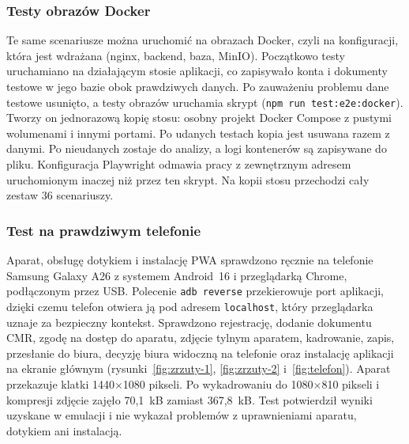 \subsubsection{Testy obrazów Docker}

Te same scenariusze można uruchomić na obrazach Docker, czyli na konfiguracji,
która jest wdrażana (nginx, backend, baza, MinIO). Początkowo testy
uruchamiano na działającym stosie aplikacji, co zapisywało konta i dokumenty
testowe w jego bazie obok prawdziwych danych. Po zauważeniu problemu dane
testowe usunięto, a testy obrazów uruchamia skrypt
 (\texttt{npm run test:e2e:docker}). Tworzy on
jednorazową kopię stosu: osobny projekt Docker Compose z pustymi wolumenami
i innymi portami. Po udanych testach kopia jest usuwana razem z danymi. Po nieudanych
zostaje do analizy, a logi kontenerów są zapisywane do pliku.
Konfiguracja Playwright odmawia pracy z zewnętrznym adresem uruchomionym
inaczej niż przez ten skrypt. Na kopii stosu przechodzi cały zestaw 36
scenariuszy.

\subsubsection{Test na prawdziwym telefonie}

Aparat, obsługę dotykiem i instalację PWA sprawdzono ręcznie na telefonie
Samsung Galaxy A26 z systemem Android~16 i przeglądarką Chrome, podłączonym
przez USB. Polecenie \texttt{adb reverse} przekierowuje port aplikacji, dzięki
czemu telefon otwiera ją pod adresem \texttt{localhost}, który przeglądarka
uznaje za bezpieczny kontekst. Sprawdzono rejestrację, dodanie dokumentu CMR,
zgodę na dostęp do aparatu, zdjęcie tylnym aparatem, kadrowanie, zapis,
przesłanie do biura, decyzję biura widoczną na telefonie oraz instalację
aplikacji na ekranie głównym (rysunki~\ref{fig:zrzuty-1}, \ref{fig:zrzuty-2}
i~\ref{fig:telefon}). Aparat przekazuje klatki 1440$\times$1080 pikseli. Po
wykadrowaniu do 1080$\times$810 pikseli i kompresji zdjęcie zajęło 70,1~kB
zamiast 367,8~kB. Test potwierdził wyniki uzyskane w emulacji i nie wykazał
problemów z uprawnieniami aparatu, dotykiem ani instalacją.

